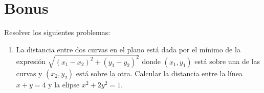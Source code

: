 \documentclass[a4paper, 11pt]{article}
\begin{document}
    \maketitle

    \section{Bonus}

    \begin{ejercicio}
        Resolver los siguientes problemas:
        \begin{enumerate}
            \item La distancia entre dos curvas en el plano está dada por el mínimo de la expresión $\sqrt{(x_1-x_2)^2+(y_1-y_2)^2}$ donde $(x_1,y_1)$ está sobre una de las curvas y $(x_2,y_2)$ está sobre la otra. Calcular la distancia entre la línea $x+y=4$ y la elipse $x^2+2y^2=1$.
        \end{enumerate}
    \end{ejercicio}
\end{document}
